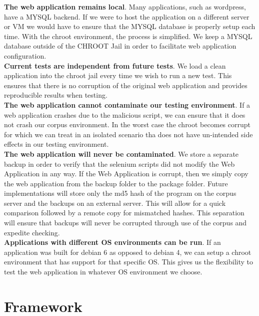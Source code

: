 \documentclass[letterpaper,twocolumn,10pt]{article}
\begin{document}
{\bf The web application remains local}.  Many applications, such as wordpress, have a MYSQL backend.  If we were to host the application on a different server or VM we would have to ensure that the MYSQL database is properly setup each time.  With the chroot environment, the process is simplified. We keep a MYSQL database outside of the CHROOT Jail in order to facilitate web application configuration.  \\

{\bf Current tests are independent from future tests}.  We load a clean application into the chroot jail every time we wish to run a new test.  This ensures that there is no corruption of the original web application and provides reproducible results when testing.\\

{\bf The web application cannot contaminate our testing environment}.  If a web application crashes due to the malicious script, we can ensure that it does not crash our corpus environment.  In the worst case the chroot becomes corrupt for which we can treat in an isolated scenario tha does not have un-intended side effects in our testing environment.  \\

{\bf The web application will never be contaminated}.  We store a separate backup in order to verify that the selenium scripts did not modify the Web Application in any way.  If the Web Application is corrupt, then we simply copy the web application from the backup folder to the package folder.  Future implementations will store only the md5 hash of the program on the corpus server and the backups on an external server.  This will allow for a quick comparison followed by a remote copy for mismatched hashes.  This separation will ensure that backups will never be corrupted through use of the corpus and expedite checking.  \\

{\bf Applications with different OS environments can be run}.  If an application was built for debian 6 as opposed to debian 4, we can setup a chroot environment that has support for that specific OS.  This gives us the flexibility to test the web application in whatever OS environment we choose.

\section{Framework}
\end{document}
